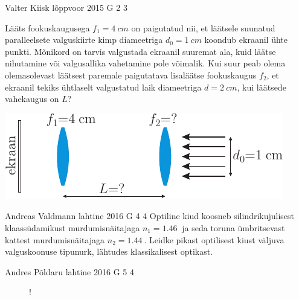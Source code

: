 \documentclass[11pt, twoside]{article}
\begin{document}
{%
{Valter Kiisk} %
{lõppvoor} %
{2015} %
{G 2} %
{3} %
{
\ifStatement
Lääts fookuskaugusega $f_1=\SI{4}{cm}$ on paigutatud nii, et läätsele suunatud paralleelsete valguskiirte kimp diameetriga $d_0=\SI{1}{cm}$ koondub ekraanil ühte punkti. Mõnikord on tarvis valgustada ekraanil suuremat ala, kuid läätse nihutamine või valgusallika vahetamine pole võimalik. Kui suur peab olema olemasolevast läätsest paremale paigutatava lisaläätse fookuskaugus $f_2$, et ekraanil tekiks ühtlaselt valgustatud laik diameetriga $d=\SI{2}{cm}$, kui läätsede vahekaugus on $L$?
\begin{center}
\includegraphics[scale=1.5]{2015-v3g-02-valgustamine-yles}
\end{center}
\fi
}

{Andreas Valdmann} %
{lahtine} %
{2016} %
{G 4} %
{4} %
{
\ifStatement
Optiline kiud koosneb silindrikujulisest klaassüdamikust murdumisnäitajaga $n_1=\SI{1,46}{}$ ja seda toruna ümbritsevast kattest murdumisnäitajaga $n_2=\SI{1,44}{}$. Leidke pikast optilisest kiust väljuva valguskoonuse tipunurk, lähtudes klassikalisest optikast.
\fi
}

{Andres Põldaru} %
{lahtine} %
{2016} %
{G 5} %
{4} %
{
\ifStatement
\begin{figure}
	\vspace{-20pt}
	\begin{resizebox}{0.6\textwidth}{!}{
}
	\end{resizebox}
\end{figure}

}}
\end{document}
